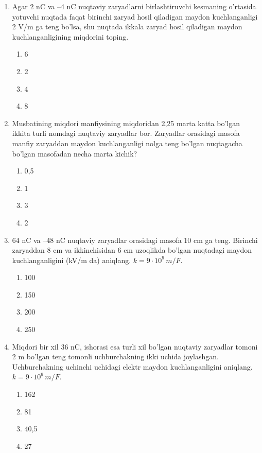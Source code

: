 \begin{enumerate}
    \item Agar 2 nC va –4 nC nuqtaviy zaryadlarni birlashtiruvchi kesmaning o’rtasida yotuvchi nuqtada faqat birinchi zaryad hosil qiladigan maydon kuchlanganligi 2 V/m ga teng bo’lsa, shu nuqtada ikkala zaryad hosil qiladigan maydon kuchlanganligining miqdorini toping. 
    \begin{enumerate}[label=\Alph*)]
        \item 6 %
        \item 2
        \item 4
        \item 8
    \end{enumerate}

    \item Musbatining miqdori manfiysining miqdoridan 2,25 marta katta bo’lgan ikkita turli nomdagi nuqtaviy zaryadlar bor. Zaryadlar orasidagi masofa manfiy zaryaddan maydon kuchlanganligi nolga teng bo’lgan nuqtagacha bo’lgan masofadan necha marta kichik? 
    \begin{enumerate}[label=\Alph*)]
        \item 0,5
        \item 1
        \item 3
        \item 2 %
    \end{enumerate}

    \item 64 nC va –48 nC nuqtaviy zaryadlar orasidagi masofa 10 cm ga teng. Birinchi zaryaddan 8 cm va ikkinchisidan 6 cm uzoqlikda bo’lgan nuqtadagi maydon kuchlanganligini (kV/m da) aniqlang. $k=9 \cdot 10^9 \, m/F$. 
    \begin{enumerate}[label=\Alph*)]
        \item 100
        \item 150 %
        \item 200
        \item 250
    \end{enumerate}

    \item Miqdori bir xil 36 nC, ishorasi esa turli xil bo’lgan nuqtaviy zaryadlar tomoni 2 m bo’lgan teng tomonli uchburchakning ikki uchida joylashgan. Uchburchakning uchinchi uchidagi elektr maydon kuchlanganligini aniqlang. $k=9 \cdot 10^9 \, m/F$. 
    \begin{enumerate}[label=\Alph*)]
        \item 162
        \item 81 %
        \item 40,5
        \item 27
    \end{enumerate}


\end{enumerate}
